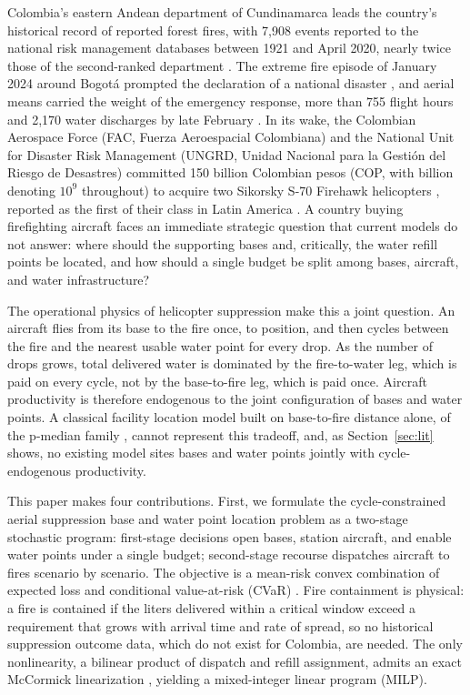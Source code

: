 \documentclass[11pt]{article}
\begin{document}
Colombia's eastern Andean department of Cundinamarca leads the
country's historical record of reported forest fires, with 7,908
events reported to the national risk management databases between
1921 and April 2020, nearly twice those of the second-ranked
department \citep{ungrdnd}. The extreme fire episode of January 2024
around Bogot{\'a} prompted the declaration of a national disaster
\citep{decreto2024}, and aerial means carried the weight of the
emergency response, more than 755 flight hours and 2,170 water
discharges by late February \citep{ungrd2024}. In its wake, the
Colombian Aerospace Force (FAC, Fuerza Aeroespacial Colombiana) and
the National Unit for Disaster Risk Management (UNGRD, Unidad
Nacional para la Gesti{\'o}n del Riesgo de Desastres) committed 150
billion Colombian pesos (COP, with billion denoting $10^9$
throughout) to acquire two Sikorsky S-70 Firehawk helicopters
\citep{fac2025}, reported as the first of their class in Latin
America \citep{infodefensa2025}. A country buying firefighting
aircraft faces
an immediate strategic question that current models do not answer:
where should the supporting bases and, critically, the water refill
points be located, and how should a single budget be split among bases,
aircraft, and water infrastructure?

The operational physics of helicopter suppression make this a joint
question. An aircraft flies from its base to the fire once, to
position, and then cycles between the fire and the nearest usable water
point for every drop. As the number of drops grows, total delivered
water is dominated by the fire-to-water leg, which is paid on every
cycle, not by the base-to-fire leg, which is paid once. Aircraft
productivity is therefore endogenous to the joint configuration of
bases and water points. A classical facility location model built on
base-to-fire distance alone, of the p-median family
\citep{mladenovic2007}, cannot represent this tradeoff, and, as
Section~\ref{sec:lit} shows, no existing model sites bases and water
points jointly with cycle-endogenous productivity.

This paper makes four contributions. First, we formulate the
cycle-constrained aerial suppression base and water point location
problem as a two-stage stochastic program: first-stage decisions open
bases, station aircraft, and enable water points under a single budget;
second-stage recourse dispatches aircraft to fires scenario by
scenario. The objective is a mean-risk convex combination of expected
loss and conditional value-at-risk (CVaR) \citep{rockafellar2000}. Fire
containment is physical: a fire is contained if the liters delivered
within a critical window exceed a requirement that grows with arrival
time and rate of spread, so no historical suppression outcome data,
which do not exist for Colombia, are needed. The only nonlinearity, a
bilinear product of dispatch and refill assignment, admits an exact
McCormick linearization \citep{gupte2013}, yielding a mixed-integer
linear program (MILP).
\end{document}
